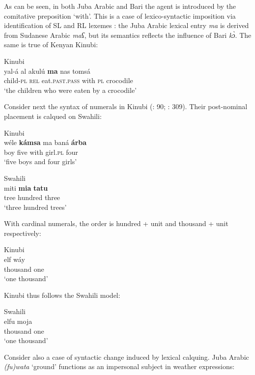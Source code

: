 \documentclass[output=paper]{langsci/langscibook}
\begin{document}
As can be seen, in both Juba Arabic and Bari the agent is introduced by the comitative preposition ‘with’. This is a case of lexico-syntactic imposition via identification of SL and RL lexemes \citep[415]{Manfredi2018}: the Juba Arabic lexical entry \textit{ma} is derived from Sudanese Arabic \textit{maʕ}, but its semantics reflects the influence of Bari \textit{kɔ̀}. The same is true of Kenyan Kinubi:

\ea\label{ex:key:}
{       Kinubi \citep[230]{Luffin2005}}\\
\gll yal-á al akulú \textbf{ma} nas tomsá\\
     child-\textsc{pl} \textsc{rel} eat.\textsc{past.pass} with \textsc{pl} crocodile\\
\glt     `the children who were eaten by a crocodile'
\z

Consider next the syntax of numerals in Kinubi (\citealt{Wellens2003}: 90; \citealt{Luffin2014}: 309). Their post-nominal placement is calqued on Swahili:

\ea\label{ex:key:}
{Kinubi \citep[309]{Luffin2014}}\\
\gll wéle \textbf{kámsa} ma baná \textbf{árba}\\
     boy five with girl.\textsc{pl} four\\
\glt     `five boys and four girls'
\z

\ea\label{ex:key:}
{Swahili \citep[309]{Luffin2014}}\\
\gll miti \textbf{mia} \textbf{tatu}\\
     tree hundred three\\
\glt     `three hundred trees'
\z

With cardinal numerals, the order is hundred + unit and thousand + unit respectively:

 

 \ea\label{ex:key:}
{Kinubi \citep[309]{Luffin2014}}\\

\gll   elf wáy\\
       thousand one\\
\glt      `one thousand'
\z

Kinubi thus follows the Swahili model:

\ea
{Swahili \citep[309]{Luffin2014}}\\
\gll            elfu moja \\
                thousand one \\
\glt     `one thousand'
\z

Consider also a case of syntactic change induced by lexical calquing. Juba Arabic \textit{(fu)wata} ‘ground’ functions as an impersonal subject in weather expressions:
\end{document}
